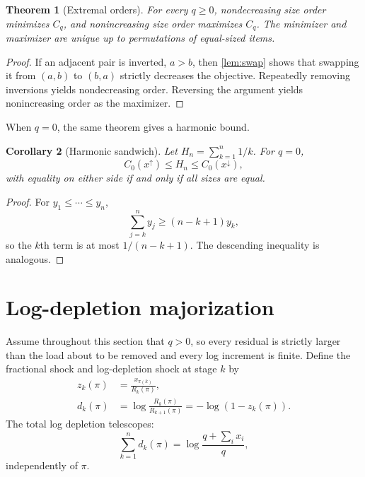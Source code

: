 \documentclass[pdflatex,iicol,sn-basic]{sn-jnl}
\theoremstyle{thmstyleone}
\newtheorem{theorem}{Theorem}[section]
\newtheorem{corollary}[theorem]{Corollary}
\theoremstyle{thmstyletwo}
\theoremstyle{thmstylethree}
\begin{document}
\begin{theorem}[Extremal orders]
\label{thm:sort}
For every \(q\ge 0\), nondecreasing size order minimizes \(C_q\), and
nonincreasing size order maximizes \(C_q\). The minimizer and maximizer are
unique up to permutations of equal-sized items.
\end{theorem}

\begin{proof}
If an adjacent pair is inverted, \(a>b\), then \cref{lem:swap} shows that
swapping it from \((a,b)\) to \((b,a)\) strictly decreases the objective.
Repeatedly removing inversions yields nondecreasing order. Reversing the
argument yields nonincreasing order as the maximizer.
\end{proof}

When \(q=0\), the same theorem gives a harmonic bound.

\begin{corollary}[Harmonic sandwich]
\label{cor:harmonic}
Let \(H_n=\sum_{k=1}^n 1/k\). For \(q=0\),
\[
C_0(x^{\uparrow})\le H_n\le C_0(x^{\downarrow}),
\]
with equality on either side if and only if all sizes are equal.
\end{corollary}

\begin{proof}
For \(y_1\le\cdots\le y_n\),
\[
\sum_{j=k}^n y_j\ge(n-k+1)y_k,
\]
so the \(k\)th term is at most \(1/(n-k+1)\). The descending inequality is
analogous.
\end{proof}

\section{Log-depletion majorization}
\label{sec:majorization}

Assume throughout this section that \(q>0\), so every residual is strictly
larger than the load about to be removed and every log increment is finite.
Define the fractional shock and log-depletion shock at stage \(k\) by
\begin{equation}\label{eq:z-d}
\begin{aligned}
z_k(\pi)&=\frac{x_{\pi(k)}}{R_k(\pi)},\\
d_k(\pi)&=\log\frac{R_k(\pi)}{R_{k+1}(\pi)}
=-\log(1-z_k(\pi)).
\end{aligned}
\end{equation}
The total log depletion telescopes:
\begin{equation}\label{eq:fixedsum}
\sum_{k=1}^n d_k(\pi)
=\log\frac{q+\sum_i x_i}{q},
\end{equation}
independently of \(\pi\).
\end{document}
